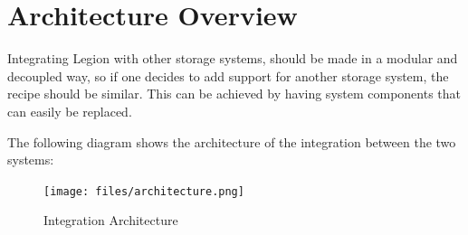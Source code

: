 \section{Architecture Overview}
\label{sec:architecture_overview}
Integrating Legion with other storage systems, should be made in a modular and decoupled way, so if one decides to add support for another storage system, the recipe should be similar. This can be achieved by having system components that can easily be replaced.\par
	The following diagram shows the architecture of the integration between the two systems:
	
\begin{figure}[h]
\centering
\texttt{[image: files/architecture.png]}
\caption{Integration Architecture}
\label{architecture}
\end{figure}

